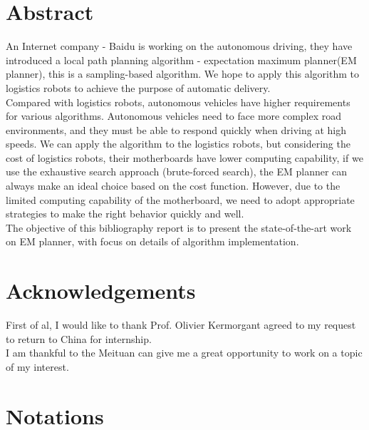 \documentclass{report}
\begin{document}
   
 
  \section*{Abstract}
\par An Internet company - Baidu is working on the autonomous driving, they have introduced a local path planning algorithm - expectation maximum planner(EM planner), this is a sampling-based algorithm. We hope to apply this algorithm to logistics robots to achieve the purpose of automatic delivery.\\
\indent
Compared with logistics robots, autonomous vehicles have higher requirements for various algorithms. Autonomous vehicles need to face more complex road environments, and they must be able to respond quickly when driving at high speeds.
We can apply the algorithm to the logistics robots, but considering the cost of logistics robots, their motherboards have lower computing capability, if we use the exhaustive search approach (brute-forced search), the EM planner can always make an ideal choice based on the cost function. However, due to the limited computing capability of the motherboard, we need to adopt appropriate strategies to make the right behavior quickly and well.\\
\indent
The objective of this bibliography report is to present the state-of-the-art work on EM planner, with focus on details of algorithm implementation.


 \newpage
 
 \section*{Acknowledgements}
 First of al, I would like to thank Prof. Olivier Kermorgant agreed to my request to return to China for internship. \\
 \indent
 I am thankful to the Meituan can give me a great opportunity to work on a topic of my interest.
 
 \newpage
 
 \section*{Notations}
 
\end{document}
